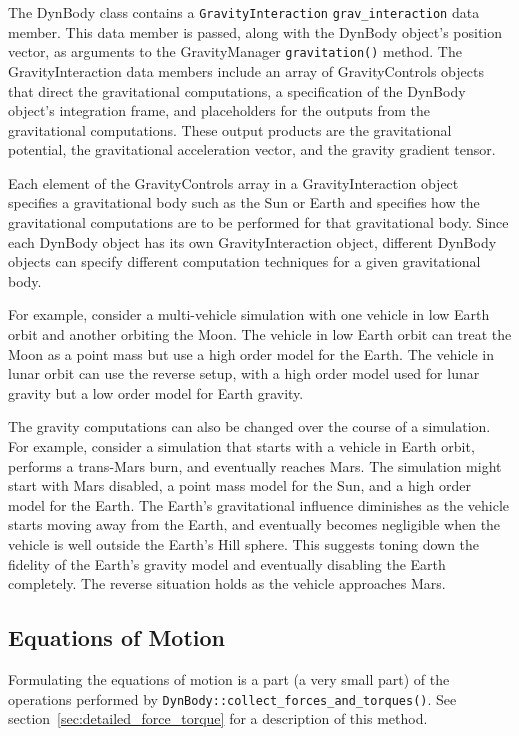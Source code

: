 The DynBody class contains a \verb+GravityInteraction+
\verb+grav_interaction+ data member. This data member is passed, along
with the DynBody object's position vector, as arguments to the GravityManager
\verb+gravitation()+ method. The GravityInteraction data members include
an array of GravityControls objects that direct the gravitational computations,
a specification of the DynBody object's integration frame, and
placeholders for the outputs from the gravitational computations.
These output products are
the gravitational potential,
the gravitational acceleration vector,
and the gravity gradient tensor.

Each element of the GravityControls array in a GravityInteraction object
specifies a gravitational body such as the Sun or Earth and specifies how
the gravitational computations are to be performed for that gravitational body.
Since each DynBody object has its own GravityInteraction object, different
DynBody objects can specify different computation techniques for a given
gravitational body.

For example, consider a multi-vehicle simulation with one vehicle in low Earth
orbit and another orbiting the Moon. The vehicle in low Earth orbit can
treat the Moon as a point mass but use a high order model for the Earth.
The vehicle in lunar orbit can use the reverse setup, with a high order model
used for lunar gravity but a low order model for Earth gravity.

The gravity computations can also be changed over the course of a simulation.
For example, consider a simulation that starts with a vehicle in Earth orbit,
performs a trans-Mars burn, and eventually reaches Mars. The simulation
might start with Mars disabled, a point mass model for the Sun, and a high order
model for the Earth. The Earth's gravitational influence diminishes as the
vehicle starts moving away from the Earth, and eventually becomes negligible
when the vehicle is well outside the Earth's Hill sphere. This suggests toning
down the fidelity of the Earth's gravity model and eventually disabling the
Earth completely. The reverse situation holds as the vehicle approaches Mars.

\subsection{Equations of Motion}\label{sec:detailed_eom}

Formulating the equations of motion is a part (a very small part) of the
operations performed by \verb+DynBody::collect_forces_and_torques()+.
See section~\ref{sec:detailed_force_torque} for a description of this method.


